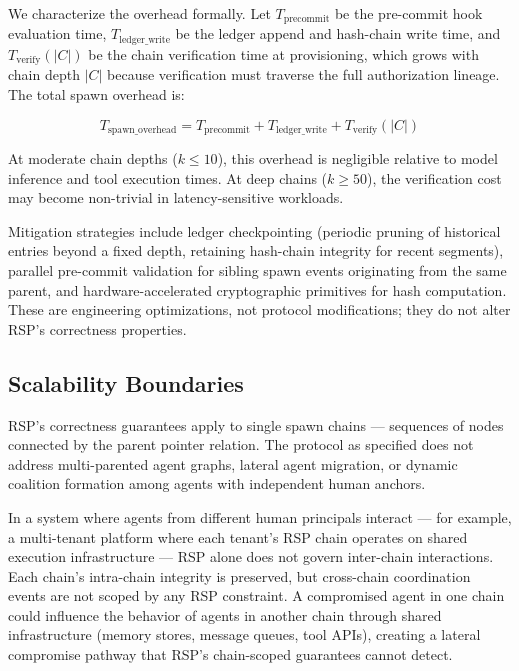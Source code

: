 We characterize the overhead formally. Let $T_{\mathrm{precommit}}$ be the pre-commit hook evaluation time, $T_{\mathrm{ledger\_write}}$ be the ledger append and hash-chain write time, and $T_{\mathrm{verify}}(|C|)$ be the chain verification time at provisioning, which grows with chain depth $|C|$ because verification must traverse the full authorization lineage. The total spawn overhead is:

\begin{equation}
T_{\mathrm{spawn\_overhead}} = T_{\mathrm{precommit}} + T_{\mathrm{ledger\_write}} + T_{\mathrm{verify}}(|C|)
\label{eq:spawn-overhead}
\end{equation}

At moderate chain depths ($k \leq 10$), this overhead is negligible relative to model inference and tool execution times. At deep chains ($k \geq 50$), the verification cost may become non-trivial in latency-sensitive workloads.

Mitigation strategies include ledger checkpointing (periodic pruning of historical entries beyond a fixed depth, retaining hash-chain integrity for recent segments), parallel pre-commit validation for sibling spawn events originating from the same parent, and hardware-accelerated cryptographic primitives for hash computation. These are engineering optimizations, not protocol modifications; they do not alter RSP's correctness properties.

\subsection{Scalability Boundaries}
\label{sec:rs-limitations-scalability}

RSP's correctness guarantees apply to single spawn chains — sequences of nodes connected by the parent pointer relation. The protocol as specified does not address multi-parented agent graphs, lateral agent migration, or dynamic coalition formation among agents with independent human anchors.

In a system where agents from different human principals interact — for example, a multi-tenant platform where each tenant's RSP chain operates on shared execution infrastructure — RSP alone does not govern inter-chain interactions. Each chain's intra-chain integrity is preserved, but cross-chain coordination events are not scoped by any RSP constraint. A compromised agent in one chain could influence the behavior of agents in another chain through shared infrastructure (memory stores, message queues, tool APIs), creating a lateral compromise pathway that RSP's chain-scoped guarantees cannot detect.

